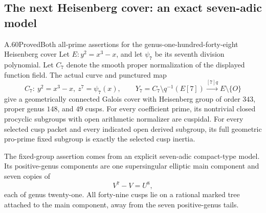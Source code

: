 \subsection{The next Heisenberg cover: an exact seven-adic model}

\begin{statement}{A.60}{Proved}{Both all-prime assertions for the genus-one-hundred-forty-eight Heisenberg cover}
Let \(E:y^2=x^3-x\), and let \(\psi _7\) be its seventh
division polynomial. Let \(C_7\) denote the smooth proper
normalization of the displayed function field. The actual
curve and punctured map
\[
 C_7:\ y^2=x^3-x,\ z^7=\psi _7(x),\qquad
 Y_7=C_7\setminus q^{-1}(E[7])
              \xrightarrow{[7]q}E\setminus\{O\}       \tag{A.60.1}
\]
give a geometrically connected Galois cover with Heisenberg
group of order \(343\), proper genus \(148\), and \(49\)
cusps. For every coefficient prime, its nontrivial closed
procyclic subgroups with open arithmetic normalizer are
cuspidal. For every selected cusp packet and every indicated
open derived subgroup, its full geometric pro-prime fixed
subgroup is exactly the selected cusp inertia.

The fixed-group assertion comes from an explicit seven-adic
compact-type model. Its positive-genus components are one
supersingular elliptic main component and seven copies of
\[
                              V^7-V=U^8,               \tag{A.60.2}
\]
each of genus twenty-one. All forty-nine cusps lie on a
rational marked tree attached to the main component, away
from the seven positive-genus tails.
\end{statement}

